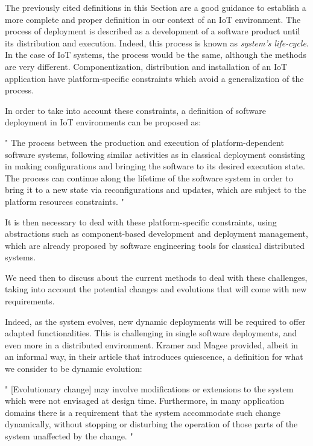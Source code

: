 The previously cited definitions in this Section are a good guidance to establish a more complete and proper definition in our context of an IoT environment.
The process of deployment is described as a development of a software product until its distribution and execution.
Indeed, this process is known as \textit{system's life-cycle}.
In the case of IoT systems, the process would be the same, although the methods are very different.
Componentization, distribution and installation of an IoT application have platform-specific constraints which avoid a generalization of the process.

In order to take into account these constraints, a definition of software deployment in IoT environments can be proposed as:
\begin{citeverbatim}
	" The process between the production and execution of platform-dependent software systems, following similar activities as in classical deployment consisting in making configurations and bringing the software to its desired execution state. The process can continue along the lifetime of the software system in order to bring it to a new state via reconfigurations and updates, which are subject to the platform resources constraints. "
\end{citeverbatim}
It is then necessary to deal with these platform-specific constraints, using abstractions such as component-based development and deployment management, which are already proposed by software engineering tools for classical distributed systems.

We need then to discuss about the current methods to deal with these challenges, taking into account the potential changes and evolutions that will come with new requirements.

Indeed, as the system evolves, new dynamic deployments will be required to offer adapted functionalities.
This is challenging in single software deployments, and even more in a distributed environment.
Kramer and Magee \cite{kramer1990evolving} provided, albeit in an informal way, in their article that introduces quiescence, a definition for what we consider to be dynamic evolution:
\begin{citeverbatim}
	" [Evolutionary change] may involve modifications or extensions to the system which were not envisaged at design time.
	Furthermore, in many application domains there is a requirement that the system accommodate such change dynamically, without stopping or disturbing the operation of those parts of the system unaffected by the change. "
\end{citeverbatim}

